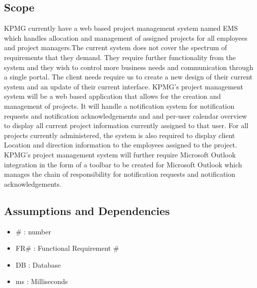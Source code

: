 \documentclass[a4paper,12pt]{article}
\begin{document}
	\subsection{Scope}
	\begin{flushleft}
		KPMG currently have a web based project management system named EMS which handles allocation and management of assigned projects for all employees and project managers.The current system does not cover the spectrum of requirements that they demand. They require further functionality from the system and they wish to control more business needs and communication through a single portal. The client needs require us to create a new design of their current system and an update of their current interface.
		\linebreak
		\linebreak
		KPMG's project management system will be a web based application that allows for the creation and management of projects. It will handle a notification system for notification requests and notification acknowledgements and and per-user calendar overview to display all current project information currently assigned to that user. For all projects currently administered, the system is also required to display client Location and direction information to the employees assigned to the project.
		\linebreak
		\linebreak
		KPMG's project management system will further require Microsoft Outlook integration in the form of a toolbar to be created for Microsoft Outlook which manages the chain of responsibility for notification requests and notification acknowledgements.
	\end{flushleft}
	
	\subsection{Assumptions and Dependencies}
	\begin{itemize}
		\item \# :  number
		\item FR# : Functional Requirement #
		\item DB : Database
		\item ms : Milliseconds 
	\end{itemize} 
	
	\newpage
\end{document}
